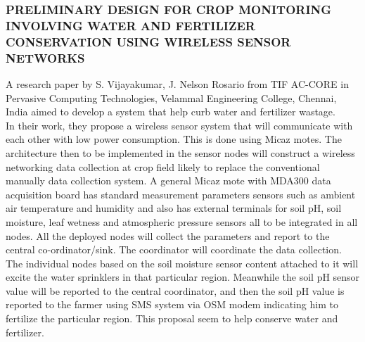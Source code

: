 \documentclass[12pt, a4paper]{article}
\begin{document}
\subsubsection{PRELIMINARY DESIGN FOR CROP MONITORING INVOLVING WATER AND FERTILIZER CONSERVATION USING WIRELESS SENSOR NETWORKS}
A research paper by S. Vijayakumar, J. Nelson Rosario \cite{vijayakumar2011preliminary} from TIF AC-CORE in Pervasive Computing Technologies, Velammal Engineering College, Chennai, India aimed to develop a system that help curb water and fertilizer wastage.\\
In their work, they propose a wireless sensor system that will communicate with each other with low power consumption. This is done using Micaz motes. The architecture then to be implemented in the sensor nodes will construct a wireless networking data collection at crop field likely to replace the conventional manually data collection system. A general Micaz mote with MDA300 data acquisition board has standard measurement parameters sensors such as ambient air temperature and humidity and also has external terminals for soil pH, soil moisture, leaf wetness and atmospheric pressure sensors all to be integrated in all nodes. All the deployed nodes will collect the parameters and report to the central co-ordinator/sink. The coordinator will coordinate the data collection. The individual nodes based on the soil moisture sensor content attached to it will excite the water sprinklers in that particular region. Meanwhile the soil pH sensor value will be reported to the central coordinator, and then the soil pH value is reported to the farmer using SMS system via OSM modem indicating him to fertilize the particular region. This proposal seem to help conserve water and fertilizer.
\end{document}
